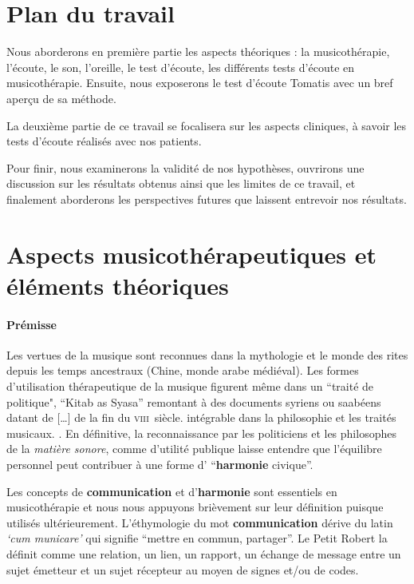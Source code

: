 	 


\section*{Plan du travail}


Nous aborderons en première partie les aspects théoriques : la musicothérapie, l'écoute, le son, l'oreille, le 
test d'écoute, les différents tests d'écoute en musicothérapie. Ensuite, nous 
exposerons le test d'écoute Tomatis avec un bref aperçu de sa méthode.

 
La deuxième partie de ce travail se focalisera sur les aspects
cliniques, à savoir les tests d'écoute réalisés  avec  nos patients. 

Pour finir, nous examinerons la validité de nos hypothèses, ouvrirons
une discussion sur les résultats obtenus ainsi que les limites de ce
travail, et finalement aborderons les perspectives futures que
laissent entrevoir nos résultats.



\section{{Aspects musicothérapeutiques et éléments théoriques}}


\paragraph{Prémisse}

Les vertues de la musique sont reconnues dans la mythologie et le
monde des rites depuis les temps ancestraux (Chine, monde arabe
médiéval). 
Les formes d'utilisation 
thérapeutique de la musique figurent même dans un ``traité de politique",
``Kitab as Syasa'' remontant à des documents syriens ou saabéens datant de  [\dots] de la fin du 
\textsc{viii}\ieme\ siècle.   intégrable dans la 
philosophie et les traités musicaux. \autocite[ch. III, p. 
96]{vrait_musicotherapie_2018}.
En définitive, la reconnaissance par les  politiciens  et les
philosophes de la \textit{matière sonore}, comme d'utilité
publique laisse entendre que l'équilibre personnel
peut contribuer à une forme d' ``\textbf{harmonie }civique''.




Les concepts de \textbf{communication} et  d'\textbf{harmonie} 
sont essentiels en
musicothérapie et nous nous appuyons brièvement
sur leur définition puisque utilisés ultérieurement.
L'éthymologie du mot  \textbf{communication} dérive du latin  \textit{`cum
  municare'} qui signifie ``mettre en commun, partager''.
Le Petit Robert la définit comme une
relation, un lien, un rapport, un échange de message entre un sujet émetteur et un
sujet récepteur au moyen de signes et/ou de codes.

